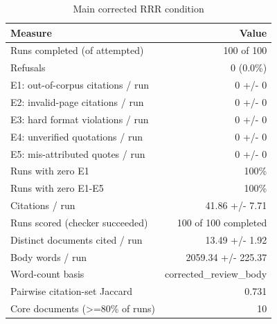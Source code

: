 \begin{table}[ht]
\centering
\caption{Main corrected RRR condition}
\scriptsize
\begin{tabular}{lr}
\toprule
Measure & Value \\
\midrule
Runs completed (of attempted) & 100 of 100 \\
Refusals & 0 (0.0\%) \\
E1: out-of-corpus citations / run & 0 +/- 0 \\
E2: invalid-page citations / run & 0 +/- 0 \\
E3: hard format violations / run & 0 +/- 0 \\
E4: unverified quotations / run & 0 +/- 0 \\
E5: mis-attributed quotes / run & 0 +/- 0 \\
Runs with zero E1 & 100\% \\
Runs with zero E1-E5 & 100\% \\
Citations / run & 41.86 +/- 7.71 \\
Runs scored (checker succeeded) & 100 of 100 completed \\
Distinct documents cited / run & 13.49 +/- 1.92 \\
Body words / run & 2059.34 +/- 225.37 \\
Word-count basis & corrected\_review\_body \\
Pairwise citation-set Jaccard & 0.731 \\
Core documents (>=80\% of runs) & 10 \\
\bottomrule
\end{tabular}
\end{table}
